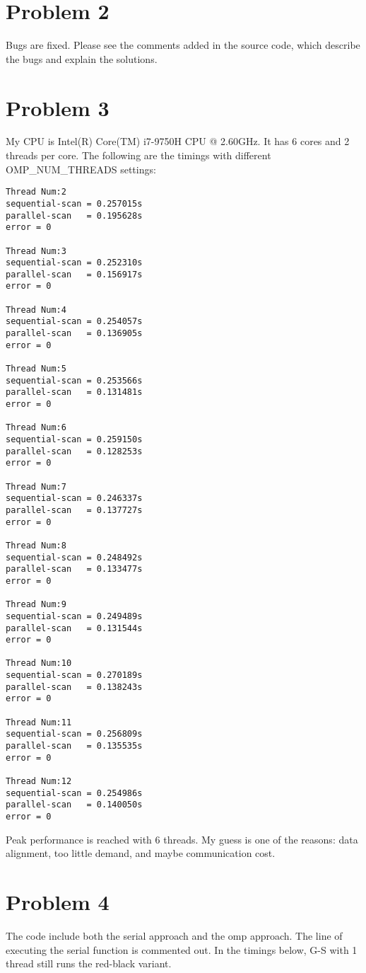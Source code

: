 \documentclass{article}
\begin{document}
\section{Problem 2}
Bugs are fixed. Please see the comments added in the source code, which describe the bugs and explain the solutions.

\section{Problem 3}
My CPU is Intel(R) Core(TM) i7-9750H CPU @ 2.60GHz. It has 6 cores and 2 threads per core.  The following are the timings with different OMP\_NUM\_THREADS settings:

\begin{lstlisting}
Thread Num:2
sequential-scan = 0.257015s
parallel-scan   = 0.195628s
error = 0

Thread Num:3
sequential-scan = 0.252310s
parallel-scan   = 0.156917s
error = 0

Thread Num:4
sequential-scan = 0.254057s
parallel-scan   = 0.136905s
error = 0

Thread Num:5
sequential-scan = 0.253566s
parallel-scan   = 0.131481s
error = 0

Thread Num:6
sequential-scan = 0.259150s
parallel-scan   = 0.128253s
error = 0

Thread Num:7
sequential-scan = 0.246337s
parallel-scan   = 0.137727s
error = 0

Thread Num:8
sequential-scan = 0.248492s
parallel-scan   = 0.133477s
error = 0

Thread Num:9
sequential-scan = 0.249489s
parallel-scan   = 0.131544s
error = 0

Thread Num:10
sequential-scan = 0.270189s
parallel-scan   = 0.138243s
error = 0

Thread Num:11
sequential-scan = 0.256809s
parallel-scan   = 0.135535s
error = 0

Thread Num:12
sequential-scan = 0.254986s
parallel-scan   = 0.140050s
error = 0
\end{lstlisting}

Peak performance is reached with 6 threads. My guess is  one of the reasons: data alignment, too little demand, and maybe communication cost.


\section{Problem 4}
The code include both the serial approach and the omp approach. The line of executing the serial function is commented out. In the timings below, G-S with 1 thread still runs the red-black variant.
\end{document}
